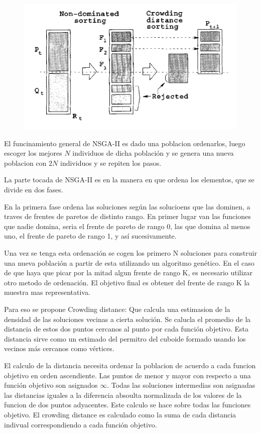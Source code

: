 \begin{figure}
    \includegraphics[width=\linewidth]{Pictures/nsga2.png}
    \label{nsga2}
\end{figure}

El funcinamiento general de NSGA-II es dado una poblacion ordenarlos, luego escoger los mejores $N$ individuos de dicha poblaci\'on y se genera una nueva poblacion con $2N$ individuos y se repiten los pasos.

La parte tocada de NSGA-II es en la manera en que ordena los elementos, que se divide en dos fases.

En la primera fase ordena las soluciones seg\'un las solucioens que las dominen, a traves de frentes de paretos de distinto rango. En primer lugar van las funciones que nadie domina, seria el frente de pareto de rango 0, las que domina al menos uno, el frente de pareto de rango 1, y as\'i sucesivamente.

Una vez se tenga esta ordenaci\'on se cogen los primero N soluciones para construir una nueva poblaci\'on a partir de esta utilizando un algoritmo gen\'etico. En el caso de que haya que picar por la mitad algun frente de rango K, es necesario utilizar otro metodo de ordenaci\'on. El objetivo final es obtener del frente de rango K la muestra mas representativa.

Para eso se propone Crowding distance:
Que calcula una estimasion de la densidad de las soluciones vecinas a cierta soluci\'on. Se calucla el promedio de la distancia de estos dos puntos cercanos al punto por cada funci\'on objetivo. Esta distancia sirve como un estimado del permitro del cuboide formado usando los vecinos m\'as cercanos como v\'ertices. 

El calculo de la distancia necesita ordenar la poblacion de acuerdo a cada funcion objetivo en orden ascendiente. Las puntos de menor y mayor con respecto a una funci\'on objetivo son asignados $\infty$. Todas las soluciones intermedias son asignadas las distancias iguales a la diferencia absoulta normalizada de los valores de la funcion de dos puntos adyacentes. Este calculo se hace sobre todas las funciones objetivo. El crowding distance es calculado como la suma de cada distancia indivual correspondiendo a cada funci\'on objetivo.

